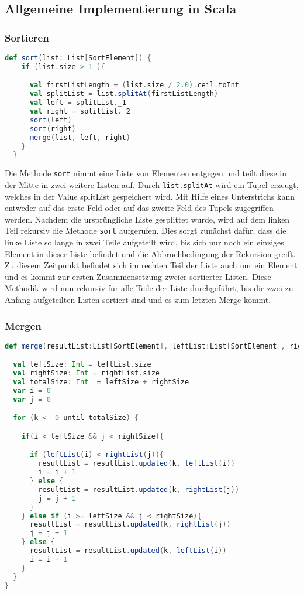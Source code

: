 \subsection{Allgemeine Implementierung in Scala}
\subsubsection{Sortieren}

\begin{lstlisting}[language=Scala]
def sort(list: List[SortElement]) {
    if (list.size > 1 ){

      val firstListLength = (list.size / 2.0).ceil.toInt
      val splitList = list.splitAt(firstListLength)
      val left = splitList._1
      val right = splitList._2
      sort(left)
      sort(right)
      merge(list, left, right)
    }
  }
\end{lstlisting}

Die Methode \texttt{sort} nimmt eine Liste von Elementen entgegen und teilt diese in der Mitte in zwei weitere Listen auf. Durch \texttt{list.splitAt} wird ein Tupel erzeugt, welches in der Value splitList gespeichert wird. Mit Hilfe eines Unterstrichs kann entweder auf das erste Feld oder auf das zweite Feld des Tupels zugegriffen werden. Nachdem die ursprüngliche Liste gesplittet wurde, wird auf dem linken Teil rekursiv die Methode \texttt{sort} aufgerufen. Dies sorgt zunächst dafür, dass die linke Liste so lange in zwei Teile aufgeteilt wird, bis sich nur noch ein einziges Element in dieser Liste befindet und die Abbruchbedingung der Rekursion greift. Zu diesem Zeitpunkt befindet sich im rechten Teil der Liste auch nur ein Element und es kommt zur ersten Zusammensetzung zweier sortierter Listen. Diese Methodik wird nun rekursiv für alle Teile der Liste durchgeführt, bis die zwei zu Anfang aufgeteilten Listen sortiert sind und es zum letzten Merge kommt.

\subsubsection{Mergen}
\begin{lstlisting}[language=Scala]
def merge(resultList:List[SortElement], leftList:List[SortElement], rightList:List[SortElement]) {

  val leftSize: Int = leftList.size
  val rightSize: Int = rightList.size
  val totalSize: Int  = leftSize + rightSize
  var i = 0
  var j = 0

  for (k <- 0 until totalSize) {

    if(i < leftSize && j < rightSize){

      if (leftList(i) < rightList(j)){
        resultList = resultList.updated(k, leftList(i))
        i = i + 1
      } else {
        resultList = resultList.updated(k, rightList(j))
        j = j + 1
      }
    } else if (i >= leftSize && j < rightSize){
      resultList = resultList.updated(k, rightList(j))
      j = j + 1
    } else {
      resultList = resultList.updated(k, leftList(i))
      i = i + 1
    }
  }
}
\end{lstlisting}

